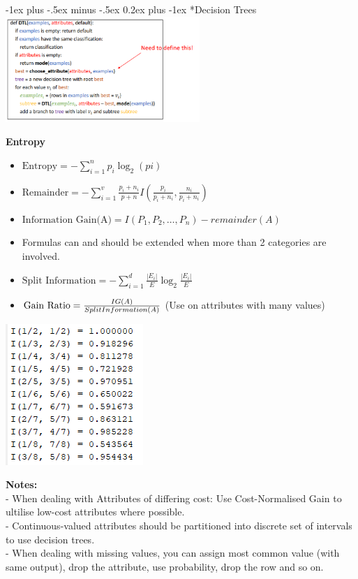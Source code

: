 \documentclass[10pt,landscape]{article}
\makeatletter
\renewcommand{\subsubsection}{\@startsection{subsubsection}{3}{0mm}%
                                {-1ex plus -.5ex minus -.5ex}%
                                {0.2ex plus -1ex}%
                                {\normalfont\footnotesize\bfseries}}
\makeatother
\begin{document}
\begin{multicols}{3}
\begin{scriptsize}
\subsubsection*{Decision Trees}
\includegraphics*[height= 4cm, width=0.8\linewidth]{decision_tree_learning.png}

\textbf{Entropy}\\
\begin{itemize}
  \item $\text{Entropy} = - \sum_{i=1}^{n} p_i \log_2 (pi)$
  \item $\text{Remainder} = - \sum_{i=1}^{v} \frac{p_i + n_i}{p+n} I(\frac{p_i}{p_i + n_i}, \frac{n_i}{p_i + n_i})$
  \item $\text{Information Gain(A)} =  I(P_1, P_2, \ldots, P_n) - remainder(A)$
  \item Formulas can and should be extended when more than 2 categories are involved.
  \item $\text{Split Information} = - \sum_{i=1}^{d} \frac{|E_i|}{E} \log_2 \frac{|E_i|}{E}$
  \item $\text{Gain Ratio} = \frac{IG(A)}{Split \space Information(A)}$ (Use on attributes with many values)
\end{itemize}

\includegraphics*[width=0.5\linewidth]{binary_entropy_table.png}

\textbf{Notes:}\\
- When dealing with Attributes of differing cost: Use Cost-Normalised Gain to ultilise low-cost attributes where possible.\\
- Continuous-valued attributes should be partitioned into discrete set of intervals to use decision trees.\\
- When dealing with missing values, you can assign most common value (with same output), drop the attribute, use probability, drop the row and so on.


\end{scriptsize}
\end{multicols}
\end{document}
